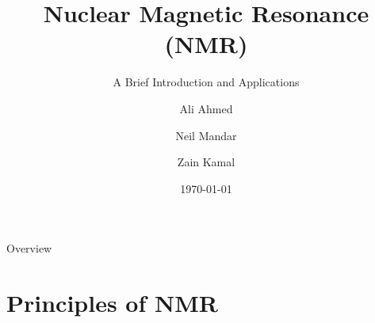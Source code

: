 \documentclass[aspectratio=169,xcolor=dvipsnames]{beamer}
\title{Nuclear Magnetic Resonance (NMR)}
\subtitle{A Brief Introduction and Applications}
\author{Ali Ahmed \and Neil Mandar \and Zain Kamal}
\institute
{
    Department of Physcis \& Astronomy, Rutgers University %
}
\date{\today} %
\begin{document}
\begin{frame}
    \titlepage
\end{frame}

\begin{frame}{Overview}
    \tableofcontents
\end{frame}

\section{Principles of NMR}
\end{document}
